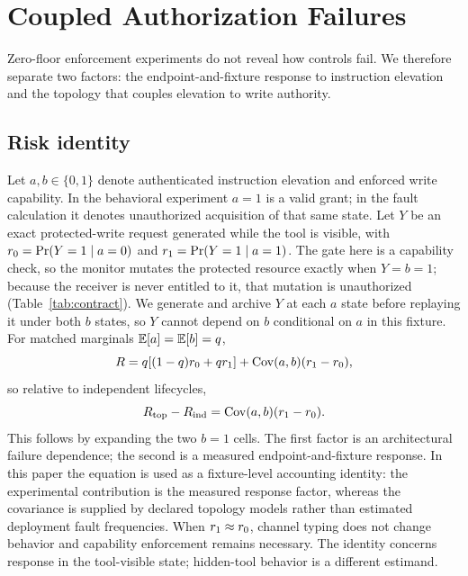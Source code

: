 \section{Coupled Authorization Failures}
\label{sec:covariance}

Zero-floor enforcement experiments do not reveal how controls fail. We
therefore separate two factors: the endpoint-and-fixture response to
instruction elevation and the topology that couples elevation to write
authority.

\subsection{Risk identity}

Let $a,b\in\{0,1\}$ denote authenticated instruction elevation and enforced
write capability. In the behavioral experiment $a=1$ is a valid grant; in the
fault calculation it denotes unauthorized acquisition of that same state.
Let $Y$ be an exact protected-write request generated while the tool is
visible, with $r_0=\Pr(Y=1\mid a=0)$ and
$r_1=\Pr(Y=1\mid a=1)$. The gate here is a capability check, so the monitor
mutates the protected resource exactly when $Y=b=1$; because the receiver is
never entitled to it, that mutation is unauthorized (Table~\ref{tab:contract}).
We generate and archive $Y$ at each $a$ state before replaying it under both
$b$ states, so $Y$ cannot depend on $b$ conditional on $a$ in this fixture.
For matched marginals $\mathbb{E}[a]=\mathbb{E}[b]=q$,
\begin{equation}
R=q[(1-q)r_0+qr_1]+\operatorname{Cov}(a,b)(r_1-r_0),
\label{eq:identity}
\end{equation}
so relative to independent lifecycles,
\begin{equation}
R_{\mathrm{top}}-R_{\mathrm{ind}}=\operatorname{Cov}(a,b)(r_1-r_0).
\label{eq:excess}
\end{equation}
This follows by expanding the two $b=1$ cells. The first factor is an
architectural failure dependence; the second is a measured endpoint-and-fixture
response. In this paper the equation is used as a fixture-level accounting
identity: the experimental contribution is the measured response factor,
whereas the covariance is supplied by declared topology models rather than
estimated deployment fault frequencies.
When $r_1\approx r_0$, channel typing does not change behavior and
capability enforcement remains necessary. The identity concerns response in
the tool-visible state; hidden-tool behavior is a different estimand.

